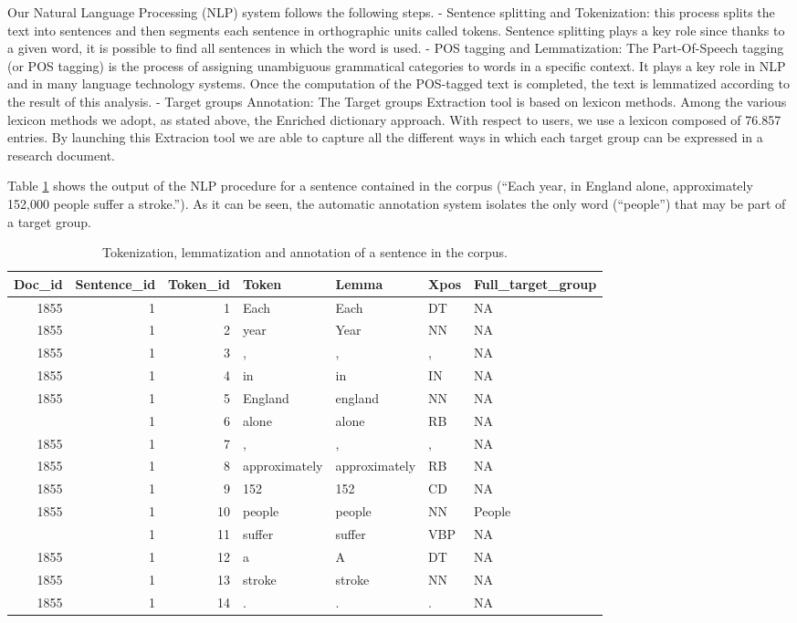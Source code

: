 \documentclass[]{book}
\begin{document}
Our Natural Language Processing (NLP) system follows the following
steps. - Sentence splitting and Tokenization: this process splits the
text into sentences and then segments each sentence in orthographic
units called tokens. Sentence splitting plays a key role since thanks to
a given word, it is possible to find all sentences in which the word is
used. - POS tagging and Lemmatization: The Part-Of-Speech tagging (or
POS tagging) is the process of assigning unambiguous grammatical
categories to words in a specific context. It plays a key role in NLP
and in many language technology systems. Once the computation of the
POS-tagged text is completed, the text is lemmatized according to the
result of this analysis. - Target groups Annotation: The Target groups
Extraction tool is based on lexicon methods. Among the various lexicon
methods we adopt, as stated above, the Enriched dictionary approach.
With respect to users, we use a lexicon composed of 76.857 entries. By
launching this Extracion tool we are able to capture all the different
ways in which each target group can be expressed in a research document.

Table \ref{tab:impact1} shows the output of the NLP procedure for a
sentence contained in the corpus (``Each year, in England alone,
approximately 152,000 people suffer a stroke.''). As it can be seen, the
automatic annotation system isolates the only word (``people'') that may
be part of a target group.

\begin{table}

\caption{\label{tab:impact1}Tokenization, lemmatization and annotation of a sentence in the corpus.}
\centering
\begin{tabular}[t]{rrrllll}
\toprule
Doc\_id & Sentence\_id & Token\_id & Token & Lemma & Xpos & Full\_target\_group\\
\midrule
1855 & 1 & 1 & Each & Each & DT & NA\\
1855 & 1 & 2 & year & Year & NN & NA\\
1855 & 1 & 3 & , & , & , & NA\\
1855 & 1 & 4 & in & in & IN & NA\\
1855 & 1 & 5 & England & england & NN & NA\\
\addlinespace
1855 & 1 & 6 & alone & alone & RB & NA\\
1855 & 1 & 7 & , & , & , & NA\\
1855 & 1 & 8 & approximately & approximately & RB & NA\\
1855 & 1 & 9 & 152 & 152 & CD & NA\\
1855 & 1 & 10 & people & people & NN & People\\
\addlinespace
1855 & 1 & 11 & suffer & suffer & VBP & NA\\
1855 & 1 & 12 & a & A & DT & NA\\
1855 & 1 & 13 & stroke & stroke & NN & NA\\
1855 & 1 & 14 & . & . & . & NA\\
\bottomrule
\end{tabular}
\end{table}
\end{document}
